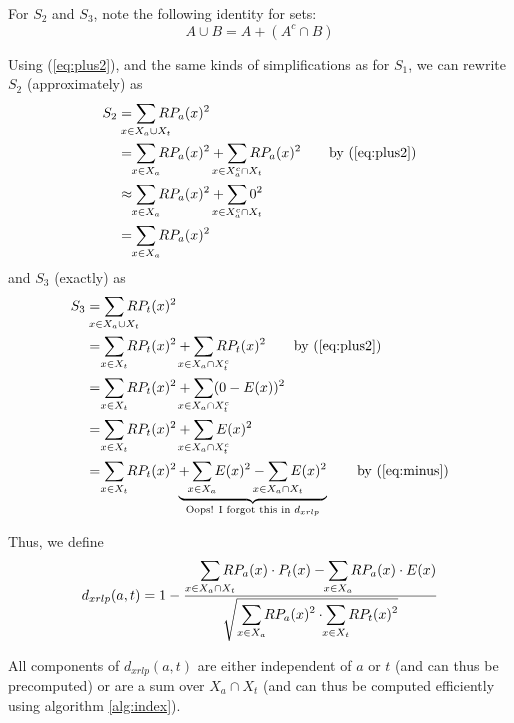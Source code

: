 \documentclass[twocolumn,10pt]{article}
\begin{document}
For $S_2$ and $S_3$, note the following identity for sets:
\begin{equation}
\label{eq:plus2}
A \cup B = A + (A^c \cap B)
\end{equation}

Using (\ref{eq:plus2}), and the same kinds of simplifications
as for $S_1$, we can rewrite $S_2$ (approximately) as
\begin{align*}
S_2
&=
    \smashoperator{\sum_{x \in X_a \cup X_t}} RP_a(x)^2
\\
&=
    \smashoperator{\sum_{x \in X_a}} RP_a(x)^2
    + \smashoperator{\sum_{x \in X_a^c \cap X_t}} RP_a(x)^2
\tag*{by (\ref{eq:plus2})}
\\
&\approx
    \smashoperator{\sum_{x \in X_a}} RP_a(x)^2
    + \smashoperator{\sum_{x \in X_a^c \cap X_t}} 0^2
\\
&= 
    \smashoperator{\sum_{x \in X_a}} RP_a(x)^2
\end{align*}
and $S_3$ (exactly) as 
\begin{align*}
S_3
&=
    \smashoperator{\sum_{x \in X_a \cup X_t}} RP_t(x)^2
\\
&=
    \smashoperator{\sum_{x \in X_t}} RP_t(x)^2
    + \smashoperator{\sum_{x \in X_a \cap X_t^c}} RP_t(x)^2
\tag*{by (\ref{eq:plus2})}
\\
&=
    \smashoperator{\sum_{x \in X_t}} RP_t(x)^2
    + \smashoperator{\sum_{x \in X_a \cap X_t^c}} (0 - E(x))^2
\\
&=
    \smashoperator{\sum_{x \in X_t}} RP_t(x)^2
    + \smashoperator{\sum_{x \in X_a \cap X_t^c}} E(x)^2
\\
&=
    \smashoperator{\sum_{x \in X_t}} RP_t(x)^2
    \underbrace{
    + \smashoperator{\sum_{x \in X_a}} E(x)^2
    - \smashoperator{\sum_{x \in X_a \cap X_t}} E(x)^2
    }_{\text{Oops! I forgot this in $d_{xrlp}$}}
\tag*{by (\ref{eq:minus})}
\end{align*}

Thus, we define
$$
d_{xrlp}(a, t)
= 1 -
\frac{\displaystyle
    \smashoperator[r]{\sum_{x \in X_a \cap X_t}}
        RP_a(x) \cdot P_t(x)
    - \smashoperator{\sum_{x \in X_a}}
        RP_a(x) \cdot E(x)
}{\displaystyle
    \sqrt{\smashoperator[r]{\sum_{x \in X_a}} RP_a(x)^2
    \cdot \smashoperator{\sum_{x \in X_t}} RP_t(x)^2}
}
$$

All components of $d_{xrlp}(a, t)$ are either independent of
$a$ or $t$ (and can thus be precomputed) or are a sum over
$X_a \cap X_t$ (and can thus be computed efficiently using
algorithm \ref{alg:index}).
\end{document}
